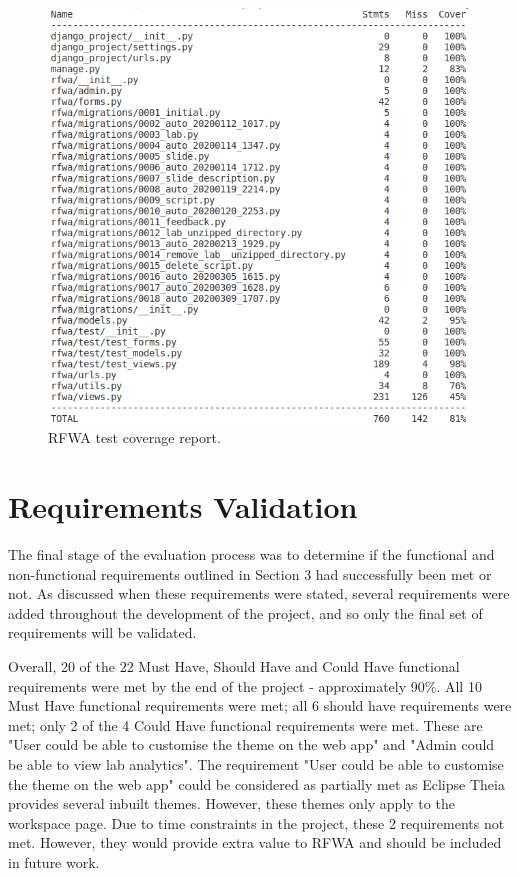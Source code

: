 \documentclass{l4proj}
\begin{document}
\begin{figure}[h]
    \centering
    \includegraphics[scale=0.64]{images/coverage_report.png}
    \caption{RFWA test coverage report.}
\end{figure}

\section{Requirements Validation}

The final stage of the evaluation process was to determine if the functional and non-functional
requirements outlined in Section 3 had successfully been met or not. As discussed when these
requirements were stated, several requirements were added throughout the development of the
project, and so only the final set of requirements will be validated. 

Overall, 20 of the 22 Must Have, Should Have and Could Have functional requirements were met by the end of the project - approximately 90\%. All 10 Must Have functional requirements were met; all 6 should have requirements were met; only 2 of the 4 Could Have functional requirements were met. These are "User could be able to customise the theme on the web app" and "Admin could be able to view lab analytics". The requirement "User could be able to customise the theme on the web app" could be considered as partially met as Eclipse Theia provides several inbuilt themes. However, these themes only apply to the workspace page. Due to time constraints in the project, these 2 requirements not met. However, they would provide extra value to RFWA and should be included in future work.
\end{document}
